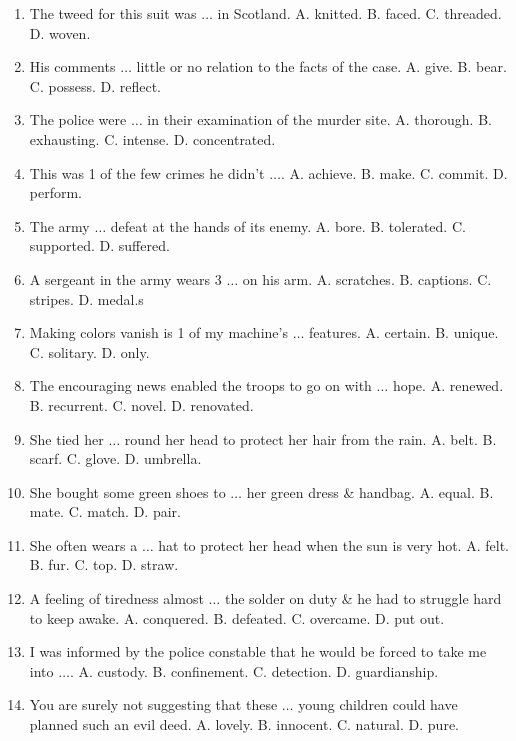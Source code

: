 \documentclass{article}
\numberwithin{equation}{section}
\begin{document}
\begin{enumerate}[leftmargin=8mm]
	\item The tweed for this suit was $\ldots$ in Scotland. {\sf A.} knitted. {\sf B.} faced. {\sf C.} threaded. {\sf D.} woven.
	\item His comments $\ldots$ little or no relation to the facts of the case. {\sf A.} give. {\sf B.} bear. {\sf C.} possess. {\sf D.} reflect.
	\item The police were $\ldots$ in their examination of the murder site. {\sf A.} thorough. {\sf B.} exhausting. {\sf C.} intense. {\sf D.} concentrated.
	\item This was 1 of the few crimes he didn't $\ldots$. {\sf A.} achieve. {\sf B.} make. {\sf C.} commit. {\sf D.} perform.
	\item The army $\ldots$ defeat at the hands of its enemy. {\sf A.} bore. {\sf B.} tolerated. {\sf C.} supported. {\sf D.} suffered.
	\item A sergeant in the army wears 3 $\ldots$ on his arm. {\sf A.} scratches. {\sf B.} captions. {\sf C.} stripes. {\sf D.} medal.s
	\item Making colors vanish is 1 of my machine's $\ldots$ features. {\sf A.} certain. {\sf B.} unique. {\sf C.} solitary. {\sf D.} only.
	\item The encouraging news enabled the troops to go on with $\ldots$ hope. {\sf A.} renewed. {\sf B.} recurrent. {\sf C.} novel. {\sf D.} renovated.
	\item She tied her $\ldots$ round her head to protect her hair from the rain. {\sf A.} belt. {\sf B.} scarf. {\sf C.} glove. {\sf D.} umbrella.
	\item She bought some green shoes to $\ldots$ her green dress \& handbag. {\sf A.} equal. {\sf B.} mate. {\sf C.} match. {\sf D.} pair.
	\item She often wears a $\ldots$ hat to protect her head when the sun is very hot. {\sf A.} felt. {\sf B.} fur. {\sf C.} top. {\sf D.} straw.
	\item A feeling of tiredness almost $\ldots$ the solder on duty \& he had to struggle hard to keep awake. {\sf A.} conquered. {\sf B.} defeated. {\sf C.} overcame. {\sf D.} put out.
	\item I was informed by the police constable that he would be forced to take me into $\ldots$. {\sf A.} custody. {\sf B.} confinement. {\sf C.} detection. {\sf D.} guardianship.
	\item You are surely not suggesting that these $\ldots$ young children could have planned such an evil deed. {\sf A.} lovely. {\sf B.} innocent. {\sf C.} natural. {\sf D.} pure.

\end{enumerate}
\end{document}

